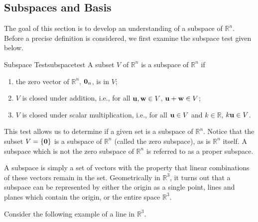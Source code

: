\subsection{Subspaces and Basis}

The goal of this section is to develop an understanding of a subspace of $\mathbb{R}^n$. Before a precise definition is considered, we first examine the subspace test given below.

\begin{theorem}{Subspace Test}{subspacetest}
A subset $V$ of $\mathbb{R}^n$ is a subspace of $\mathbb{R}^n$ if 
\begin{enumerate}
\item the zero vector of $\mathbb{R}^n$, ${\bf 0}_n$, is in $V$;
\item $V$ is closed under addition, i.e., for all ${\bf u},{\bf w}\in V$, ${\bf u}+{\bf w}\in V$;
\item $V$ is closed under scalar multiplication, i.e., for all ${\bf u}\in V$
and $k\in\mathbb{R}$, $k{\bf u}\in V$.
\end{enumerate}
\end{theorem}

This test allows us to determine if a given set is a subspace of $\mathbb{R}^n$. Notice that the subset $V = \left\{ {\bf 0} \right\}$ is a subspace of $\mathbb{R}^n$ (called the zero subspace), as is $\mathbb{R}^n$ itself. A subspace which is not the zero subspace of $\mathbb{R}^n$ is referred to as a proper subspace.

 A subspace is simply a set of vectors with the property that linear
combinations of these vectors remain in the set. Geometrically in
$\mathbb{R}^{3}$, it turns out that a subspace can be represented by
either the origin as a single point, lines and planes which contain
the origin, or the entire space $\mathbb{R}^{3}$. 

Consider the following example of a line in $\mathbb{R}^3$. 

